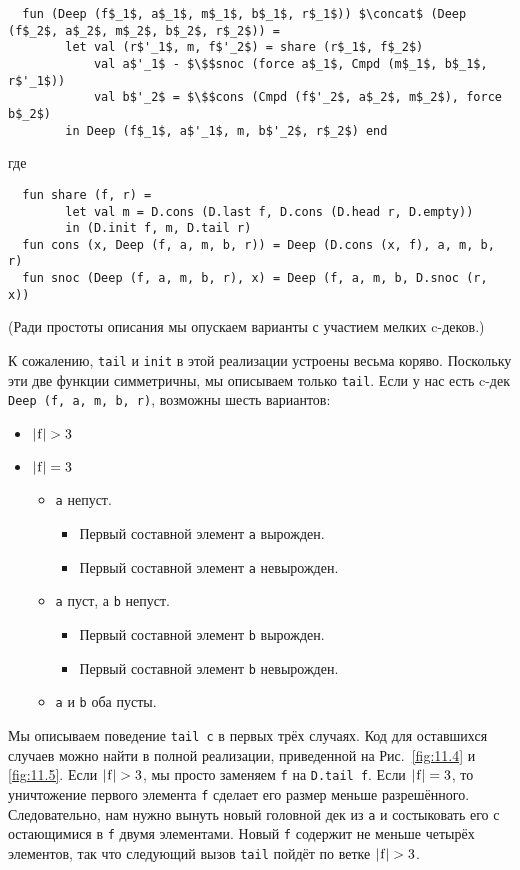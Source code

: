 \begin{lstlisting}
  fun (Deep (f$_1$, a$_1$, m$_1$, b$_1$, r$_1$)) $\concat$ (Deep (f$_2$, a$_2$, m$_2$, b$_2$, r$_2$)) =
        let val (r$'_1$, m, f$'_2$) = share (r$_1$, f$_2$)
            val a$'_1$ - $\$$snoc (force a$_1$, Cmpd (m$_1$, b$_1$, r$'_1$))
            val b$'_2$ = $\$$cons (Cmpd (f$'_2$, a$_2$, m$_2$), force b$_2$)
        in Deep (f$_1$, a$'_1$, m, b$'_2$, r$_2$) end
\end{lstlisting}
где
\begin{lstlisting}
  fun share (f, r) =
        let val m = D.cons (D.last f, D.cons (D.head r, D.empty))
        in (D.init f, m, D.tail r)
  fun cons (x, Deep (f, a, m, b, r)) = Deep (D.cons (x, f), a, m, b, r)
  fun snoc (Deep (f, a, m, b, r), x) = Deep (f, a, m, b, D.snoc (r, x))
\end{lstlisting}
(Ради простоты описания мы опускаем варианты с участием мелких
c-деков.)

К сожалению, \lstinline!tail! и \lstinline!init! в этой реализации
устроены весьма коряво. Поскольку эти две функции симметричны, мы
описываем только \lstinline!tail!. Если у нас есть c-дек
\lstinline!Deep (f, a, m, b, r)!, возможны шесть вариантов:
\begin{itemize}
\item $|\lstinline!f!| > 3$
\item $|\lstinline!f!| = 3$
  \begin{itemize}
  \item \lstinline!a! непуст.
    \begin{itemize}
    \item Первый составной элемент \lstinline!a! вырожден.
    \item Первый составной элемент \lstinline!a! невырожден.
    \end{itemize}
  \item \lstinline!a! пуст, а \lstinline!b! непуст.
    \begin{itemize}
    \item Первый составной элемент \lstinline!b! вырожден.
    \item Первый составной элемент \lstinline!b! невырожден.
    \end{itemize}
  \item \lstinline!a! и \lstinline!b! оба пусты.
  \end{itemize}
\end{itemize}
Мы описываем поведение \lstinline!tail c! в первых трёх
случаях. Код для оставшихся случаев можно найти в полной реализации,
приведенной на Рис.~\ref{fig:11.4} и \ref{fig:11.5}. Если
$|\lstinline!f!| > 3$, мы просто заменяем \lstinline!f! на
\lstinline!D.tail f!. Если $|\lstinline!f!| = 3$, то
уничтожение первого элемента \lstinline!f! сделает его размер меньше
разрешённого. Следовательно, нам нужно вынуть новый головной дек из
\lstinline!a! и состыковать его с остающимися в \lstinline!f! двумя
элементами. Новый \lstinline!f! содержит не меньше четырёх элементов,
так что следующий вызов \lstinline!tail! пойдёт по ветке
$|\lstinline!f!| > 3$.

